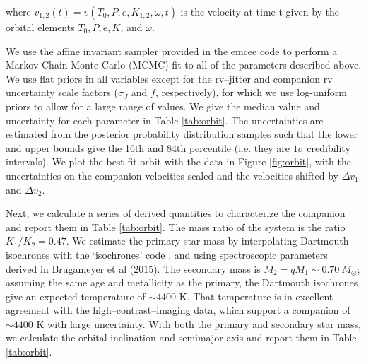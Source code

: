 \documentclass[twocolumn]{emulateapj}
\begin{document}
where $v_{1,2}(t) = v(T_0, P, e, K_{1,2}, \omega, t)$ is the velocity at time t given by the orbital elements $T_0, P, e, K$, and $\omega$.

We use the affine invariant sampler provided in the emcee code \citep{emcee} to perform a Markov Chain Monte Carlo (MCMC) fit to all of the parameters described above. We use flat priors in all variables except for the rv--jitter and companion rv uncertainty scale factors ($\sigma_J$ and $f$, respectively), for which we use log-uniform priors to allow for a large range of values.  We give the median value and uncertainty for each parameter in Table \ref{tab:orbit}. The uncertainties are estimated from the posterior probability distribution samples such that the lower and upper bounds give the 16th and 84th percentile (i.e. they are $1\sigma$ credibility intervals). We plot the best-fit orbit with the data in Figure \ref{fig:orbit}, with the uncertainties on the companion velocities scaled and the velocities shifted by $\Delta v_1$ and $\Delta v_2$. 

Next, we calculate a series of derived quantities to characterize the companion and report them in Table \ref{tab:orbit}. The mass ratio of the system is the ratio $K_1/K_2 = 0.47$. We estimate the primary star mass by interpolating Dartmouth isochrones \citep{Dotter2008} with the `isochrones' code \citep[described in][]{Montet2015}, and using spectroscopic parameters derived in Brugameyer et al (2015). The secondary mass is $M_2 = qM_1 \sim 0.70\ M_{\odot}$; assuming the same age and metallicity as the primary, the Dartmouth isochrones give an expected temperature of ${\sim}4400 $ K. That temperature is in excellent agreement with the high--contrast--imaging data, which support a companion of ${\sim}4400$ K with large uncertainty. With both the primary and secondary star mass, we calculate the orbital inclination and semimajor axis and report them in Table \ref{tab:orbit}.
\end{document}
